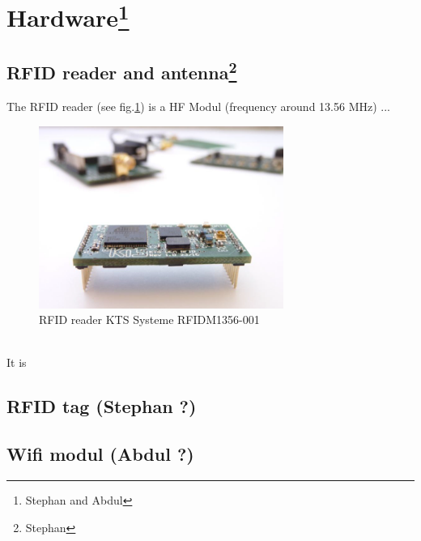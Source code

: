 \section[Hardware]{Hardware\footnote{Stephan and Abdul}}

\subsection[RFID reader and antenna]{RFID reader and antenna\footnote{Stephan}}
The RFID reader (see fig.\ref{Reader}) is a HF Modul (frequency around 13.56 MHz) ...
\begin{figure}[!htbp]
\centering
\includegraphics[width = 8cm]{Pictures/Reader}
\caption{RFID reader KTS Systeme RFIDM1356-001}
\label{Reader}
\end{figure}\\
It is\\

\subsection{RFID tag (Stephan ?)}

\subsection{Wifi modul (Abdul ?)}